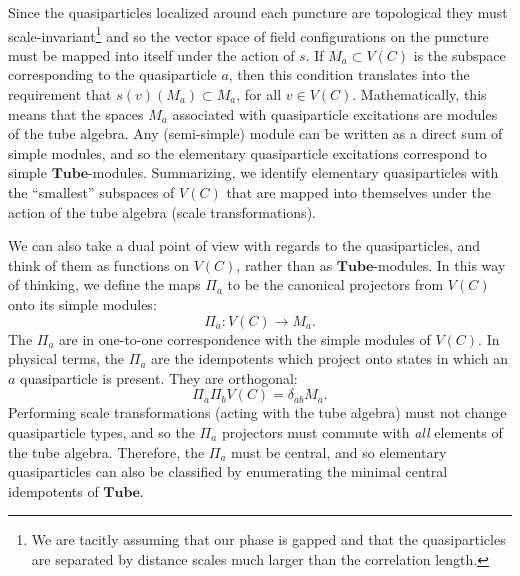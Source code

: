 \documentclass[12pt,a4paper]{article}
\newcounter{arrow}
\newcommand\be            {\begin{equation}}
\newcommand\ee            {\end{equation}}
\newcommand{\fube}{\textbf{Tube}}
\newcommand{\tube}{\textbf{Tube}}
\newcommand{\ethan}[1]{{\color{amethyst}\footnotesize{(EL) #1}}}
\begin{document}
Since the quasiparticles localized around each puncture are topological they must scale-invariant\footnote{We are tacitly assuming that our phase is gapped and that the quasiparticles are separated by distance scales much larger than the correlation length.} and so the vector space of field configurations on the puncture must be mapped into itself under the action of $s$. If $M_a \subset V(C)$ is the subspace corresponding to the quasiparticle $a$, then this condition translates into the requirement that $s(v) (M_a) \subset M_a$, for all $v \in V(C)$. 
Mathematically, this means that the spaces $M_a$ associated with quasiparticle excitations are modules of the tube algebra. Any (semi-simple) module can be written as a direct sum of simple modules, and so the elementary quasiparticle excitations correspond to simple $\tube$-modules. Summarizing, we identify elementary quasiparticles with the ``smallest'' subspaces of $V(C)$ that are mapped into themselves under the action of the tube algebra (scale transformations). 



We can also take a dual point of view with regards to the quasiparticles, and think of them as functions on $V(C)$, rather than as $\tube$-modules. In this way of thinking, we define the maps $\Pi_a$ to be the canonical projectors from $V(C)$ onto its simple modules:
\be \Pi_a : V(C) \rightarrow M_a.\ee
The $\Pi_a$ are in one-to-one correspondence with the simple modules of $V(C)$. In physical terms, the $\Pi_a$ are the idempotents which project onto states in which an $a$ quasiparticle is present. They are orthogonal:
\be \Pi_a \Pi_b V(C) = \delta_{ab}M_a.\ee
Performing scale transformations (acting with the tube algebra) must not change quasiparticle types, and so the $\Pi_a$ projectors must commute with {\it all} elements of the tube algebra. Therefore, the $\Pi_a$ must be central, and so elementary quasiparticles can also be classified by enumerating the minimal central idempotents of $\tube$. 
\end{document}
